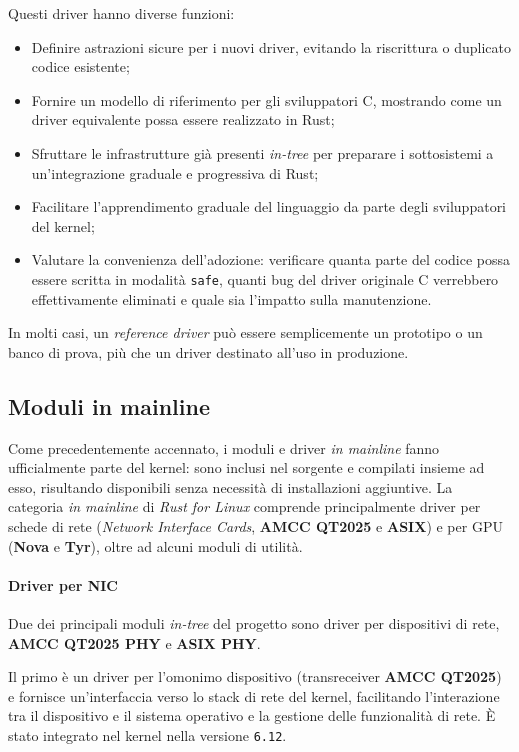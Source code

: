 \noindent Questi driver hanno diverse funzioni:
\begin{itemize}
    \item Definire astrazioni sicure per i nuovi driver, evitando la riscrittura o duplicato codice esistente;
    \item Fornire un modello di riferimento per gli sviluppatori C, mostrando come un driver equivalente possa essere realizzato in Rust;
    \item Sfruttare le infrastrutture già presenti \textit{in-tree} per preparare i sottosistemi a un'integrazione graduale e progressiva di Rust;
    \item Facilitare l'apprendimento graduale del linguaggio da parte degli sviluppatori del kernel;
    \item Valutare la convenienza dell'adozione: verificare quanta parte del codice possa essere scritta in modalità \texttt{safe}, quanti bug del driver originale C verrebbero effettivamente eliminati e quale sia l'impatto sulla manutenzione.
\end{itemize}
In molti casi, un \textit{reference driver} può essere semplicemente un prototipo o un banco di prova, più che un driver destinato all'uso in produzione.

\subsection{Moduli in mainline} 
Come precedentemente accennato, i moduli e driver \textit{in mainline} fanno ufficialmente parte del kernel: sono inclusi nel 
sorgente e compilati insieme ad esso, risultando disponibili senza necessità di installazioni aggiuntive.
La categoria \textit{in mainline} di \textit{Rust for Linux} comprende principalmente driver per schede di rete (\textit{Network Interface Cards}, \textbf{AMCC QT2025} e \textbf{ASIX}) e per GPU (\textbf{Nova} e \textbf{Tyr}), oltre ad 
alcuni moduli di utilità.

\paragraph{Driver per NIC}
Due dei principali moduli \textit{in-tree} del progetto sono driver per dispositivi di rete, \textbf{AMCC QT2025 PHY} e \textbf{ASIX PHY}.\ 

Il primo è un driver per l'omonimo dispositivo (transreceiver \textbf{AMCC QT2025}) e fornisce un'interfaccia verso lo 
stack di rete del kernel, facilitando l'interazione tra 
il dispositivo e il sistema operativo e la gestione delle funzionalità di rete.
È stato integrato nel kernel nella versione \texttt{6.12}.

